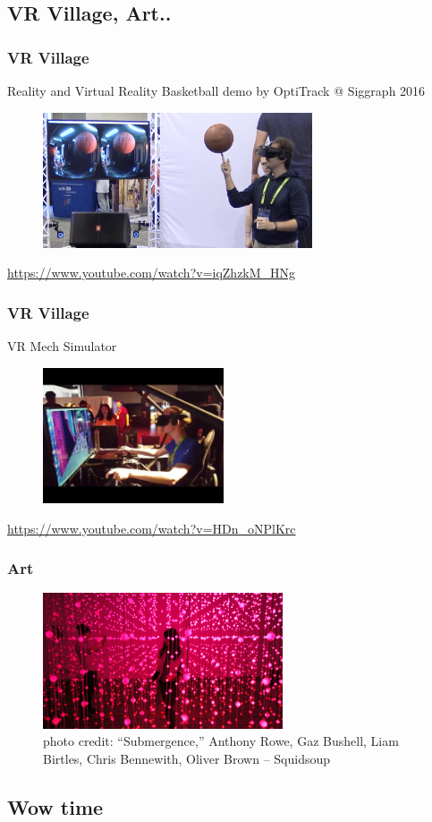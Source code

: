 \subsection{VR Village, Art..}
\frame
{
	\frametitle{VR Village}
	
	Reality and Virtual Reality Basketball demo by OptiTrack @ Siggraph 2016
	\begin{figure}
		\centering
		\includegraphics[height=4cm]{img/basket.png}
	\end{figure}
	
	\url{https://www.youtube.com/watch?v=iqZhzkM_HNg}
}
\frame
{
	\frametitle{VR Village}
	
	VR Mech Simulator
	\begin{figure}
		\centering
		\includegraphics[height=4cm]{img/vrmech.jpg}
	\end{figure}
	\url{https://www.youtube.com/watch?v=HDn_oNPlKrc}
	
}
\frame
{
	\frametitle{Art}
	\begin{figure}
		\centering
		\includegraphics[height=4cm]{img/art.png}
		\caption{photo credit: “Submergence,” Anthony Rowe, Gaz Bushell, Liam Birtles, Chris Bennewith, Oliver Brown – Squidsoup }
	\end{figure}
}
\subsection{Wow time}

